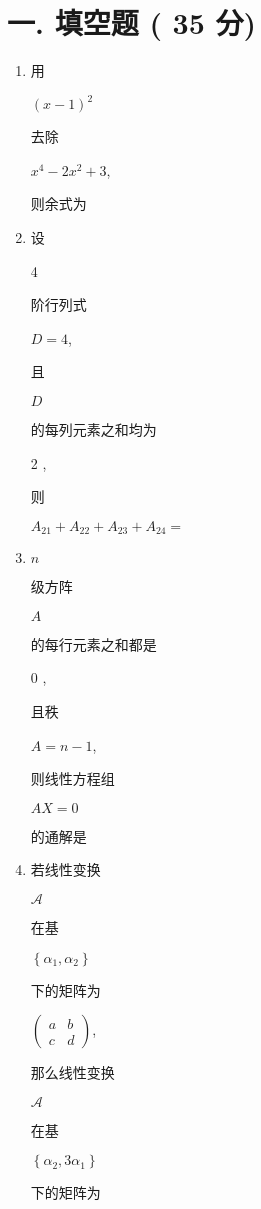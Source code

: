 \documentclass[10pt]{article}
\begin{document}
\section{一. 填空题 ( 35 分)}
\begin{enumerate}
  \item \begin{CJK}{UTF8}{mj}用\end{CJK} $(x-1)^{2}$ \begin{CJK}{UTF8}{mj}去除\end{CJK} $x^{4}-2 x^{2}+3$, \begin{CJK}{UTF8}{mj}则余式为\end{CJK}

  \item \begin{CJK}{UTF8}{mj}设\end{CJK} 4 \begin{CJK}{UTF8}{mj}阶行列式\end{CJK} $D=4$, \begin{CJK}{UTF8}{mj}且\end{CJK} $D$ \begin{CJK}{UTF8}{mj}的每列元素之和均为\end{CJK} 2 , \begin{CJK}{UTF8}{mj}则\end{CJK} $A_{21}+A_{22}+A_{23}+A_{24}=$

  \item $n$ \begin{CJK}{UTF8}{mj}级方阵\end{CJK} $A$ \begin{CJK}{UTF8}{mj}的每行元素之和都是\end{CJK} 0 , \begin{CJK}{UTF8}{mj}且秩\end{CJK} $A=n-1$, \begin{CJK}{UTF8}{mj}则线性方程组\end{CJK} $A X=0$ \begin{CJK}{UTF8}{mj}的通解是\end{CJK}

  \item \begin{CJK}{UTF8}{mj}若线性变换\end{CJK} $\mathscr{A}$ \begin{CJK}{UTF8}{mj}在基\end{CJK} $\left\{\alpha_{1}, \alpha_{2}\right\}$ \begin{CJK}{UTF8}{mj}下的矩阵为\end{CJK} $\left(\begin{array}{cc}a & b \\ c & d\end{array}\right)$, \begin{CJK}{UTF8}{mj}那么线性变换\end{CJK} $\mathscr{A}$ \begin{CJK}{UTF8}{mj}在基\end{CJK} $\left\{\alpha_{2}, 3 \alpha_{1}\right\}$ \begin{CJK}{UTF8}{mj}下的矩阵为\end{CJK}


\end{enumerate}
\end{document}
